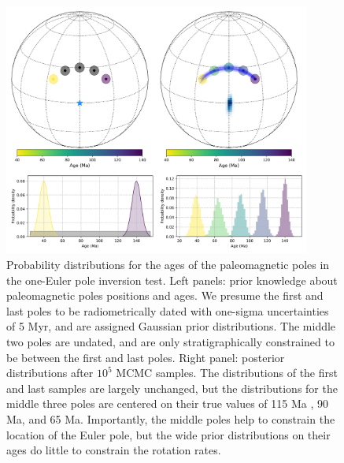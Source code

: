 \documentclass[11pt,letterpaper]{article}
\begin{document}
\begin{figure}
\centering
\includegraphics[width=0.9\textwidth]{fig_inversion_with_age_uncertainties.png}
\caption{Probability distributions for the ages of the paleomagnetic poles in the one-Euler pole inversion test. Left panels: prior knowledge about paleomagnetic poles positions and ages. We presume the first and last poles to be radiometrically dated with one-sigma uncertainties of 5 Myr, and are assigned Gaussian prior distributions. The middle two poles are undated, and are only stratigraphically constrained to be between the first and last poles. Right panel: posterior distributions after $10^5$ MCMC samples. The distributions of the first and last samples are largely unchanged, but the distributions for the middle three poles are centered on their true values of 115 Ma , 90 Ma, and 65 Ma. Importantly, the middle poles help to constrain the location of the Euler pole, but the wide prior distributions on their ages do little to constrain the rotation rates.}
\label{fig:age_uncertainty_samples}
\end{figure}
\end{document}
